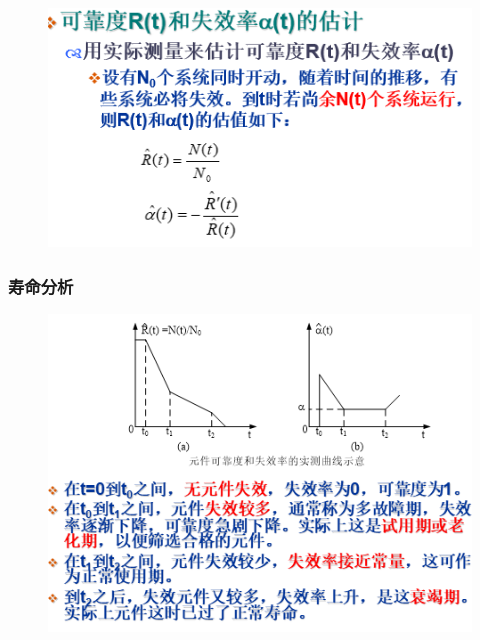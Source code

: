 \begin{figure}[H]
	\centering
	\includegraphics[width=0.7\linewidth]{figures/screenshot086}
	\caption{}
	\label{fig:screenshot086}
\end{figure}
\subsubsection{寿命分析}
\begin{figure}[H]
	\centering
	\includegraphics[width=0.7\linewidth]{figures/screenshot087}
	\caption{}
	\label{fig:screenshot087}
\end{figure}


